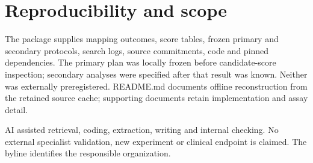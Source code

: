 \documentclass[11pt,letterpaper]{article}
\begin{document}
\section*{Reproducibility and scope}
The package supplies mapping outcomes, score tables, frozen primary and secondary protocols, search logs, source commitments, code and pinned dependencies. The primary plan was locally frozen before candidate-score inspection; secondary analyses were specified after that result was known. Neither was externally preregistered. README.md documents offline reconstruction from the retained source cache; supporting documents retain implementation and assay detail.\par
AI assisted retrieval, coding, extraction, writing and internal checking. No external specialist validation, new experiment or clinical endpoint is claimed. The byline identifies the responsible organization.\par
\end{document}
